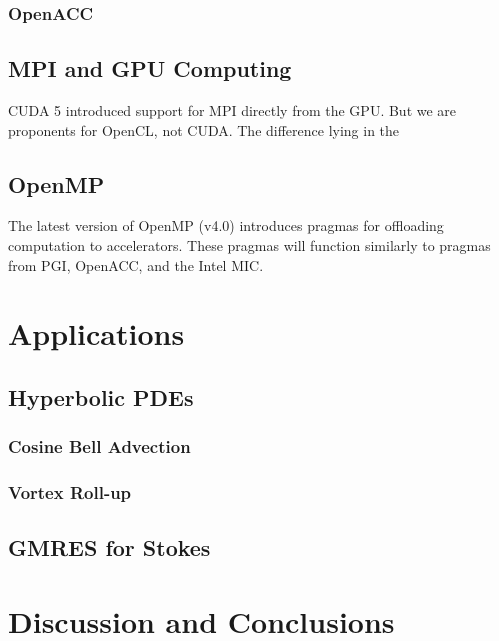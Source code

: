 \documentclass{report}
\begin{document}
\subsection{OpenACC}




\section{MPI and GPU Computing}

CUDA 5 introduced support for MPI directly from the GPU. But we are proponents for OpenCL, not CUDA. The difference lying in the 


\section{OpenMP}
The latest version of OpenMP (v4.0) introduces pragmas for offloading computation to accelerators. These pragmas will function similarly to pragmas from PGI, OpenACC, and the Intel MIC. 


\chapter{Applications}
\label{chap:applications}

\section{Hyperbolic PDEs}
\subsection{Cosine Bell Advection}
\subsection{Vortex Roll-up}

\section{GMRES for Stokes}

\chapter{Discussion and Conclusions}
\end{document}
